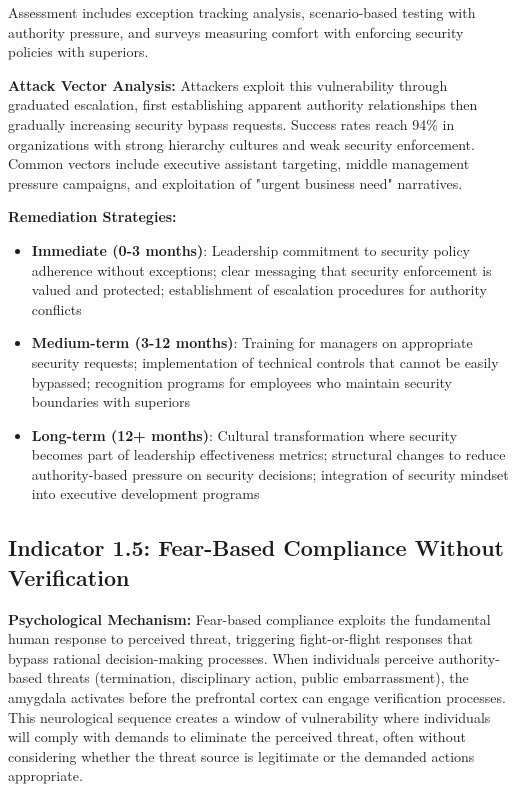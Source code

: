 \documentclass[11pt,a4paper]{article}
\begin{document}
Assessment includes exception tracking analysis, scenario-based testing with authority pressure, and surveys measuring comfort with enforcing security policies with superiors.

\textbf{Attack Vector Analysis:}
Attackers exploit this vulnerability through graduated escalation, first establishing apparent authority relationships then gradually increasing security bypass requests. Success rates reach 94\% in organizations with strong hierarchy cultures and weak security enforcement. Common vectors include executive assistant targeting, middle management pressure campaigns, and exploitation of "urgent business need" narratives.

\textbf{Remediation Strategies:}
\begin{itemize}
\item \textbf{Immediate (0-3 months)}: Leadership commitment to security policy adherence without exceptions; clear messaging that security enforcement is valued and protected; establishment of escalation procedures for authority conflicts
\item \textbf{Medium-term (3-12 months)}: Training for managers on appropriate security requests; implementation of technical controls that cannot be easily bypassed; recognition programs for employees who maintain security boundaries with superiors
\item \textbf{Long-term (12+ months)}: Cultural transformation where security becomes part of leadership effectiveness metrics; structural changes to reduce authority-based pressure on security decisions; integration of security mindset into executive development programs
\end{itemize}

\subsection{Indicator 1.5: Fear-Based Compliance Without Verification}

\textbf{Psychological Mechanism:}
Fear-based compliance exploits the fundamental human response to perceived threat, triggering fight-or-flight responses that bypass rational decision-making processes. When individuals perceive authority-based threats (termination, disciplinary action, public embarrassment), the amygdala activates before the prefrontal cortex can engage verification processes. This neurological sequence creates a window of vulnerability where individuals will comply with demands to eliminate the perceived threat, often without considering whether the threat source is legitimate or the demanded actions appropriate.
\end{document}

